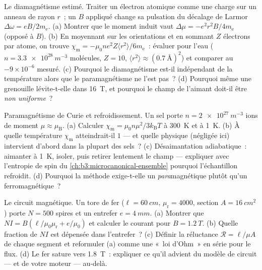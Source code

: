 \begin{exercise}[$\star\star$]\label{exo:b3:electromagnetism-in-matter:8}
Le diamagnétisme estimé. Traiter un électron atomique comme une charge
sur un anneau de rayon $r$~; un $B$ appliqué change sa pulsation du
décalage de Larmor $\Delta\omega = eB/2m_{\text{e}}$. (a) Montrer que
le moment induit vaut $\Delta\mu = -e^2r^2B/4m_{\text{e}}$ (opposé à
$B$). (b) En moyennant sur les orientations et en sommant $Z$
électrons par atome, on trouve $\chi_{\text{m}} = -\mu_0ne^2Z\langle
r^2\rangle/6m_{\text{e}}$~: évaluer pour l'eau ($n =
\qty{3.3e28}{m^{-3}}$ molécules, $Z = 10$, $\langle r^2\rangle
\approx (\qty{0.7}{\angstrom})^2$) et comparer au
$-9\times10^{-6}$ mesuré. (c) Pourquoi le diamagnétisme est-il
indépendant de la température alors que le paramagnétisme ne l'est
pas~? (d) Pourquoi même une grenouille lévite-t-elle dans
\qty{16}{T}, et pourquoi le champ de l'aimant doit-il être
\emph{non uniforme}~?
\end{exercise}

\begin{exercise}[$\star\star$]\label{exo:b3:electromagnetism-in-matter:9}
Paramagnétisme de Curie et refroidissement. Un sel porte $n =
\qty{2e27}{m^{-3}}$ ions de moment $\mu \approx \mu_{\text{B}}$.
(a) Calculer $\chi_{\text{m}} = \mu_0n\mu^2/3k_{\text{B}}T$ à
\qty{300}{K} et à \qty{1}{K}. (b) À quelle température
$\chi_{\text{m}}$ atteindrait-il $1$ --- et quelle physique (négligée
ici) intervient d'abord dans la plupart des sels~? (c) Désaimantation
adiabatique~: aimanter à \qty{1}{K}, isoler, puis retirer lentement le
champ --- expliquer avec l'entropie de spin du
\cref{ch:b3:microcanonical-ensemble} pourquoi l'échantillon
refroidit. (d) Pourquoi la méthode exige-t-elle un
\emph{para}magnétique plutôt qu'un ferromagnétique~?
\end{exercise}

\begin{exercise}[$\star\star\star$]\label{exo:b3:electromagnetism-in-matter:10}
Le circuit magnétique. Un tore de fer ($\ell = \qty{60}{cm}$,
$\mu_{\text{r}} = 4000$, section $A = \qty{16}{cm^2}$) porte
$N = 500$ spires et un entrefer $e = \qty{4}{mm}$. (a) Montrer que $NI =
B(\ell/\mu_0\mu_{\text{r}} + e/\mu_0)$ et calculer le courant pour
$B = \qty{1.2}{T}$. (b) Quelle fraction de $NI$ est dépensée dans
l'entrefer~? (c) Définir la réluctance
$\mathcal R = \ell/\mu A$ de chaque segment et reformuler (a) comme
une «~loi d'Ohm~» en série pour le flux. (d) Le fer sature vers
\qty{1.8}{T}~: expliquer ce qu'il advient du modèle de circuit --- et
de votre moteur --- au-delà.
\end{exercise}

